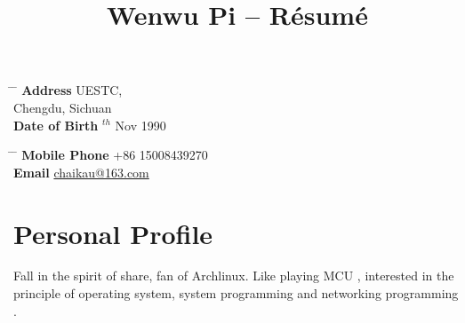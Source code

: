 \documentclass[10pt]{article} %
\begin{document}

\title{{\song Wenwu Pi} -- Résumé} %


\parbox{0.5\textwidth}{ %
\begin{tabbing} %
\hspace{3cm} \= \hspace{4cm} \= \kill %
{\bf Address} \> UESTC, \\ %
\> Chengdu, Sichuan \\ %
{\bf Date of Birth} $^{th}$ Nov 1990\\ %
\end{tabbing}}
\hfill %
\parbox{0.5\textwidth}{ %
\begin{tabbing} %
\hspace{3cm} \= \hspace{4cm} \= \kill %
{\bf Mobile Phone} \> +86 15008439270\\ %
{\bf Email} \> \href{mailto:chaikau@163.com}{chaikau@163.com} \\ %
\end{tabbing}}


\section{Personal Profile}
Fall in the spirit of share, fan of Archlinux. Like playing MCU , interested in the principle of operating system, system programming and networking programming . 
\end{document}
